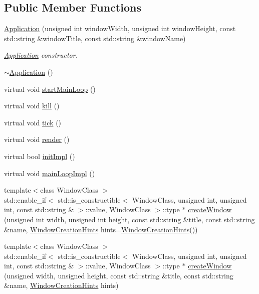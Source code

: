 \subsection*{Public Member Functions}
\begin{DoxyCompactItemize}
\item 
\mbox{\hyperlink{classec_1_1_application_af4a94888105d739a2de75be17ce9ad67}{Application}} (unsigned int window\+Width, unsigned int window\+Height, const std\+::string \&window\+Title, const std\+::string \&window\+Name)
\begin{DoxyCompactList}\small\item\em \mbox{\hyperlink{classec_1_1_application}{Application}} constructor. \end{DoxyCompactList}\item 
\mbox{\hyperlink{classec_1_1_application_abe00fd469062e9710bfda9f9d13765f3}{$\sim$\+Application}} ()
\item 
virtual void \mbox{\hyperlink{classec_1_1_application_ad541044a8fc0ff8d6c3fc57220109a50}{start\+Main\+Loop}} ()
\item 
virtual void \mbox{\hyperlink{classec_1_1_application_a2a4c494f47bc187ddc2bb5411aa063a3}{kill}} ()
\item 
virtual void \mbox{\hyperlink{classec_1_1_application_a036ae53bcbf708c7a01deb199feeccdf}{tick}} ()
\item 
virtual void \mbox{\hyperlink{classec_1_1_application_a4fe5dcd06017ba4322eca3adec47e03e}{render}} ()
\item 
virtual bool \mbox{\hyperlink{classec_1_1_application_a1460d7083c312271285747a7cc03f7e8}{init\+Impl}} ()
\item 
virtual void \mbox{\hyperlink{classec_1_1_application_ad32692a6e65a00346ab2992eba3a86e7}{main\+Loop\+Impl}} ()
\item 
{\footnotesize template$<$class Window\+Class $>$ }\\std\+::enable\+\_\+if$<$ std\+::is\+\_\+constructible$<$ Window\+Class, unsigned int, unsigned int, const std\+::string \& $>$\+::value, Window\+Class $>$\+::type $\ast$ \mbox{\hyperlink{classec_1_1_application_af103b97a3296f63ec0597756628e26f9}{create\+Window}} (unsigned int width, unsigned int height, const std\+::string \&title, const std\+::string \&name, \mbox{\hyperlink{structec_1_1_window_creation_hints}{Window\+Creation\+Hints}} hints=\mbox{\hyperlink{structec_1_1_window_creation_hints}{Window\+Creation\+Hints}}())
\item 
{\footnotesize template$<$class Window\+Class $>$ }\\std\+::enable\+\_\+if$<$ std\+::is\+\_\+constructible$<$ Window\+Class, unsigned int, unsigned int, const std\+::string \& $>$\+::value, Window\+Class $>$\+::type $\ast$ \mbox{\hyperlink{classec_1_1_application_a85fa865bee513c973b317edc1ac6ec35}{create\+Window}} (unsigned width, unsigned height, const std\+::string \&title, const std\+::string \&name, \mbox{\hyperlink{structec_1_1_window_creation_hints}{Window\+Creation\+Hints}} hints)
\end{DoxyCompactItemize}
